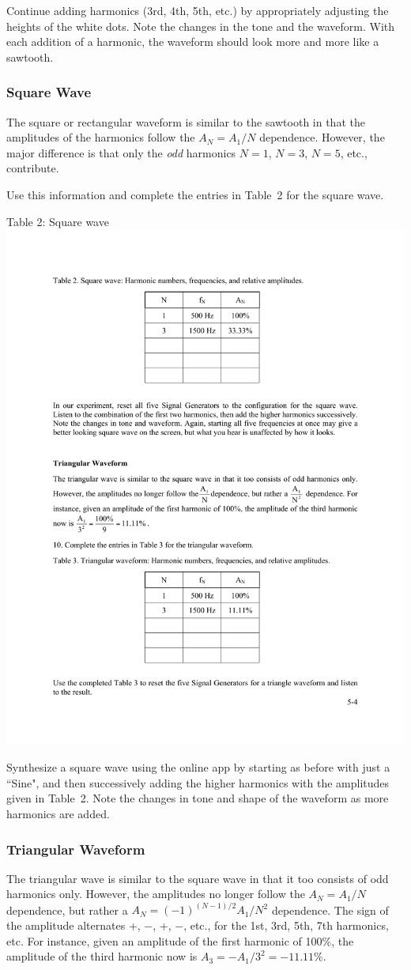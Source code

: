 \documentclass[11pt]{NSF}
\begin{document}
Continue adding harmonics (3rd, 4th, 5th, etc.) by appropriately
adjusting the heights of the white dots.
Note the changes in the tone and the waveform.
With each addition of a harmonic, the waveform should look more and 
more like a sawtooth.

\subsubsection{Square Wave}

The square or rectangular waveform is similar to the sawtooth 
in that the amplitudes of the harmonics follow the 
$A_N=A_1/N$ dependence. 
However, the major difference is that only the {\em odd}
harmonics $N=1$, $N=3$, $N=5$, etc., contribute.

Use this information and complete the entries in Table~2
for the square wave.
%
\begin{table}[hbtp]
\begin{center}
Table 2: Square wave\\
\includegraphics[width=.35\textwidth]{tab5_2}
\label{t:2}
\end{center}
\end{table}

Synthesize a square wave using the online app by starting as
before with just a ``Sine", and then successively adding the
higher harmonics with the amplitudes given in Table~2.
Note the changes in tone and shape of the waveform as more
harmonics are added.

\subsubsection{Triangular Waveform}

The triangular wave is similar to the square wave in that 
it too consists of odd harmonics only. However, 
the amplitudes no longer follow the $A_N=A_1/N$ dependence, 
but rather a $A_N = (-1)^{(N-1)/2} A_1/N^2$ dependence. 
The sign of the amplitude alternates +, $-$, +, $-$, etc.,
for the 1st, 3rd, 5th, 7th harmonics, etc.
For instance, given an amplitude of the first harmonic of 100\%, 
the amplitude of the third harmonic now is
$A_3 = -A_1/3^2 = -11.11\%$.
\end{document}
